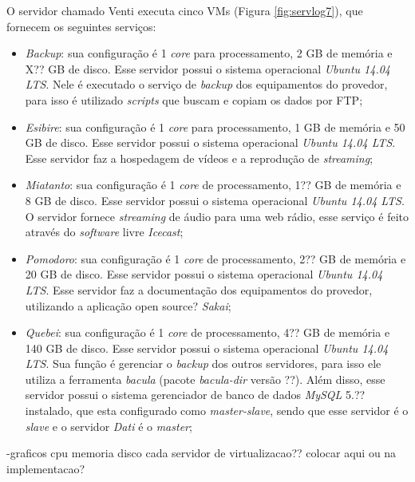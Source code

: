 O servidor chamado Venti executa cinco \ac{VM}s (Figura \ref{fig:servlog7}), que fornecem os seguintes serviços:
\begin{itemize}
 \item \textit{Backup}: sua configuração é 1 \textit{core} para processamento, 2 GB de memória e X?? GB de disco. Esse servidor possui o 
 sistema operacional \textit{Ubuntu 14.04 \ac{LTS}}. Nele é executado o serviço de \textit{backup} dos equipamentos do provedor, para isso 
 é utilizado \textit{scripts} que buscam e copiam os dados por \ac{FTP};
 
 \item \textit{Esibire}: sua configuração é 1 \textit{core} para processamento, 1 GB de memória e 50 GB de disco. Esse servidor possui o 
 sistema operacional \textit{Ubuntu 14.04 \ac{LTS}}. Esse servidor faz a hospedagem de vídeos e a reprodução de \textit{streaming};
 
 \item \textit{Miatanto}: sua configuração é 1 \textit{core} de processamento, 1?? GB de memória e 8 GB de disco. Esse servidor possui o 
 sistema operacional \textit{Ubuntu 14.04 \ac{LTS}}. O servidor fornece \textit{streaming} de áudio para uma web rádio, esse serviço é feito
 através do \textit{software} livre \textit{Icecast};
 
 \item \textit{Pomodoro}: sua configuração é 1 \textit{core} de processamento, 2?? GB de memória e 20 GB de disco. Esse servidor possui o 
 sistema operacional \textit{Ubuntu 14.04 \ac{LTS}}. Esse servidor faz a documentação dos equipamentos do provedor, utilizando a aplicação
 open source? \textit{Sakai};
 
 \item \textit{Quebei}: sua configuração é 1 \textit{core} de processamento, 4?? GB de memória e 140 GB de disco. Esse servidor possui o 
 sistema operacional \textit{Ubuntu 14.04 \ac{LTS}}. Sua função é gerenciar o \textit{backup} dos outros servidores, para isso ele utiliza a 
 ferramenta \textit{bacula} (pacote \textit{bacula-dir} versão ??). Além disso, esse servidor possui o sistema gerenciador de banco de dados 
 \textit{MySQL} 5.?? instalado, que esta configurado como \textit{master-slave}, sendo que esse servidor é o \textit{slave} e o servidor 
 \textit{Dati} é o \textit{master};
\end{itemize}

-graficos cpu memoria disco cada servidor de virtualizacao?? colocar aqui ou na implementacao?

